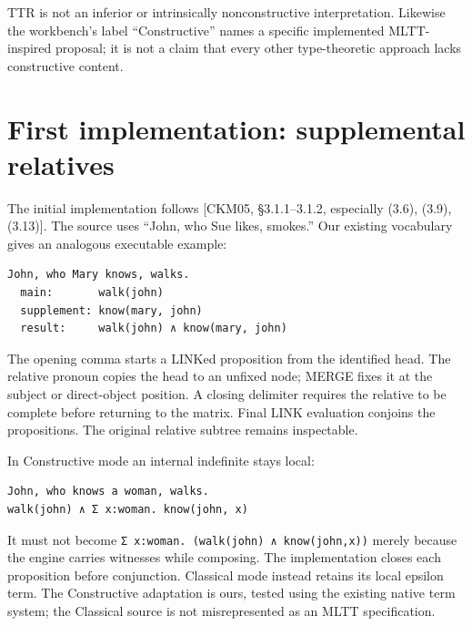 \documentclass[11pt,a4paper]{article}
\begin{document}
TTR is not an inferior or intrinsically nonconstructive interpretation.
Likewise the workbench's label ``Constructive'' names a specific
implemented MLTT-inspired proposal; it is not a claim that every other
type-theoretic approach lacks constructive content.

\section{First implementation: supplemental
relatives}\label{first-implementation-supplemental-relatives}

The initial implementation follows {[}CKM05, §3.1.1--3.1.2, especially
(3.6), (3.9), (3.13){]}. The source uses ``John, who Sue likes,
smokes.'' Our existing vocabulary gives an analogous executable example:

\begin{Verbatim}[fontsize=\small,breaklines=true,breakanywhere=true,commandchars=\\\{\},frame=single,rulecolor=\color{DSmuted},framesep=5pt]
John, who Mary knows, walks.
  main:       walk(john)
  supplement: know(mary, john)
  result:     walk(john) ∧ know(mary, john)
\end{Verbatim}

The opening comma starts a LINKed proposition from the identified head.
The relative pronoun copies the head to an unfixed node; MERGE fixes it
at the subject or direct-object position. A closing delimiter requires
the relative to be complete before returning to the matrix. Final LINK
evaluation conjoins the propositions. The original relative subtree
remains inspectable.

In Constructive mode an internal indefinite stays local:

\begin{Verbatim}[fontsize=\small,breaklines=true,breakanywhere=true,commandchars=\\\{\},frame=single,rulecolor=\color{DSmuted},framesep=5pt]
John, who knows a woman, walks.
walk(john) ∧ Σ x:woman. know(john, x)
\end{Verbatim}

It must not become \texttt{Σ\ x:woman.\ (walk(john)\ ∧\ know(john,x))}
merely because the engine carries witnesses while composing. The
implementation closes each proposition before conjunction. Classical
mode instead retains its local epsilon term. The Constructive adaptation
is ours, tested using the existing native term system; the Classical
source is not misrepresented as an MLTT specification.
\end{document}
